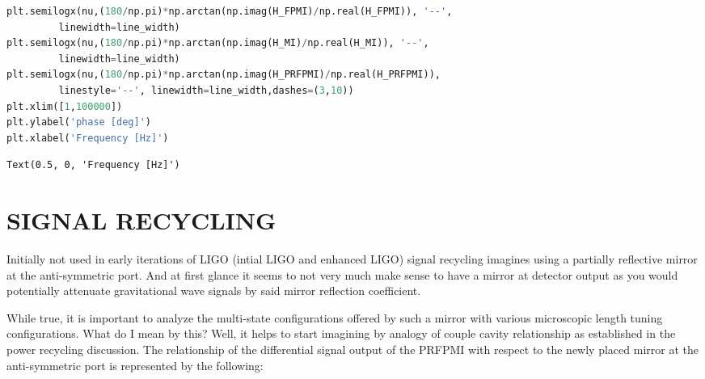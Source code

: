 \begin{spacing}{1}\begin{lstlisting}[frame=single, language=Python]
plt.semilogx(nu,(180/np.pi)*np.arctan(np.imag(H_FPMI)/np.real(H_FPMI)), '--', 
	     linewidth=line_width)
plt.semilogx(nu,(180/np.pi)*np.arctan(np.imag(H_MI)/np.real(H_MI)), '--', 
	     linewidth=line_width)
plt.semilogx(nu,(180/np.pi)*np.arctan(np.imag(H_PRFPMI)/np.real(H_PRFPMI)),
	     linestyle='--', linewidth=line_width,dashes=(3,10))
plt.xlim([1,100000])
plt.ylabel('phase [deg]')
plt.xlabel('Frequency [Hz]')
\end{lstlisting}\end{spacing}

\begin{spacing}{1}\begin{lstlisting}
Text(0.5, 0, 'Frequency [Hz]')
\end{lstlisting}\end{spacing}

\hypertarget{signal-recyclinginitially-not-used-in-early-iterations-of-ligo-intial-ligo-and-enhanced-ligo-signal-recycling-imagines-using-a-partially-reflective-mirror-at-the-anti-symmetric-port.-and-at-first-glance-it-seems-to-not-very-much-make-sense-to-have-a-mirror-at-detector-output-as-you-would-potentially-attenuate-gravitational-wave-signals-by-said-mirror-reflection-coefficient.}{%
\section{SIGNAL RECYCLING}
Initially not used in early iterations of LIGO
(intial LIGO and enhanced LIGO) signal recycling imagines using a
partially reflective mirror at the anti-symmetric port. And at first
glance it seems to not very much make sense to have a mirror at detector
output as you would potentially attenuate gravitational wave signals by
said mirror reflection
coefficient.}\label{signal-recyclinginitially-not-used-in-early-iterations-of-ligo-intial-ligo-and-enhanced-ligo-signal-recycling-imagines-using-a-partially-reflective-mirror-at-the-anti-symmetric-port.-and-at-first-glance-it-seems-to-not-very-much-make-sense-to-have-a-mirror-at-detector-output-as-you-would-potentially-attenuate-gravitational-wave-signals-by-said-mirror-reflection-coefficient.}

While true, it is important to analyze the multi-state configurations
offered by such a mirror with various microscopic length tuning
configurations. What do I mean by this? Well, it helps to start
imagining by analogy of couple cavity relationship as established in the
power recycling discussion. The relationship of the differential signal
output of the PRFPMI with respect to the newly placed mirror at the
anti-symmetric port is represented by the following:

